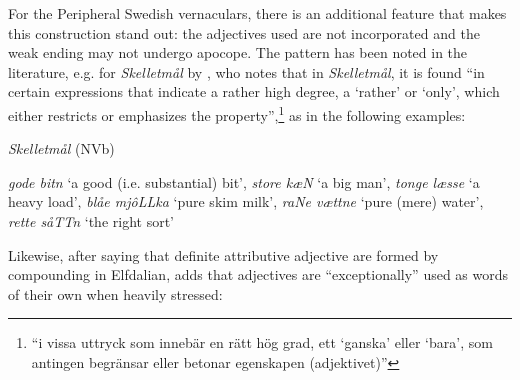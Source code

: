 {%
For the Peripheral Swedish vernaculars, there is an additional feature that makes this construction stand out: the adjectives used are not incorporated and the weak ending may not undergo apocope. The pattern has been noted in the literature, e.g. for \textit{Skelletmål} by \citet[34]{Marklund1976}, who notes that in \textit{Skelletmål}, it is found “in certain expressions that indicate a rather high degree, a ‘rather’ or ‘only’, which either restricts or emphasizes the property”,\footnote{ “i vissa uttryck som innebär en rätt hög grad, ett ‘ganska’ eller ‘bara’, som antingen begränsar eller betonar egenskapen (adjektivet)”} as in the following examples:


\item 

\textit{Skelletmål} (NVb)



\textit{gode bitn} ‘a good (i.e. substantial) bit’, \textit{store k}\textit{æ}\textit{N} ‘a big man’,\textit{ tonge læsse} ‘a heavy load’, \textit{blåe mjôLLka} ‘pure skim milk’, \textit{raNe vættne} ‘pure (mere) water’, \textit{rette såTTn }‘the right sort’


Likewise, after saying that definite attributive adjective are formed by compounding in Elfdalian, \citet[53]{Levander1909} adds that adjectives are “exceptionally” used as words of their own when heavily stressed:


\ea\label{}


}
